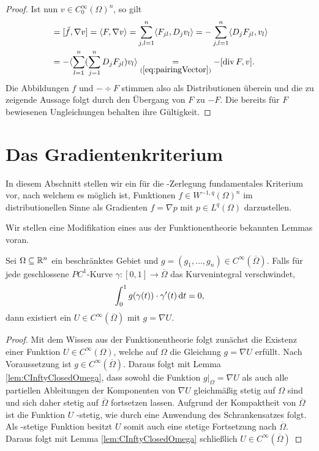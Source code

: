 \begin{proof}
  Ist nun $v \in C_0^\infty(\Omega)^n$, so gilt
  \begin{align*}
    [f,v] &= [\tilde f, \nabla v] = \langle F, \nabla v\rangle = \sum_{j,l=1}^n \langle F_{jl}, D_j v_l \rangle = -\sum_{j,l=1}^n \langle D_j F_{jl}, v_l \rangle \\
    &= - \langle \sum_{l = 1}^n ( \sum_{j = 1}^n D_j F_{jl} ) v_l \rangle \underset{(\ref{eq:pairingVector})}{=} -[\div F, v]. \\
  \end{align*}
  Die Abbildungen $f$ und $-\div F$ stimmen also als Distributionen überein und die zu zeigende Aussage folgt durch den Übergang von $F$ zu $-F$.
  Die bereits für $F$ bewiesenen Ungleichungen behalten ihre Gültigkeit.
\end{proof}

\section{Das Gradientenkriterium}

In diesem Abschnitt stellen wir ein für die \helmholtz\hyp{}Zerlegung fundamentales Kriterium vor, nach welchem es möglich ist, Funktionen $f \in W^{-1,q}(\Omega)^n$ im distributionellen Sinne als Gradienten $f = \nabla p$ mit $p \in L^q(\Omega)$ darzustellen.

Wir stellen eine Modifikation eines aus der Funktionentheorie bekannten Lemmas voran.

\begin{lem}
  \label{lem:existencePotential}
  Sei $\Omega \subseteq \mathbb{R}^n$ ein beschränktes Gebiet und $g = (g_1, \dots, g_n) \in C^\infty(\overline\Omega)$.
  Falls für jede geschlossene $PC^1$-Kurve $\gamma \colon [0,1] \to \overline\Omega$ das Kurvenintegral verschwindet,
$$
  \int_0^1 g(\gamma(t)) \cdot \gamma'(t) \, {\operatorname{d}\!{t}} = 0,  
$$
  dann existiert ein $U\in C^\infty(\overline\Omega)$ mit $g = \nabla U$.
\end{lem}

\begin{proof}
  Mit dem Wissen aus der Funktionentheorie folgt zunächst die Existenz einer Funktion $U \in C^\infty(\Omega)$, welche auf $\Omega$ die Gleichung $g = \nabla U$ erfüllt.
  Nach Voraussetzung ist $g \in C^\infty(\overline\Omega)$.
  Daraus folgt mit Lemma \ref{lem:CInftyClosedOmega}, dass sowohl die Funktion $g|_\Omega = \nabla U$ als auch alle partiellen Ableitungen der Komponenten von $\nabla U$ gleichmäßig stetig auf $\Omega$ sind und sich daher stetig auf $\overline\Omega$ fortsetzen lassen.
  Aufgrund der Kompaktheit von $\overline\Omega$ ist die Funktion $U$ \lipschitz\hyp{}stetig, wie durch eine Anwendung des Schrankensatzes folgt.
  Als \lipschitz\hyp{}stetige Funktion besitzt $U$ somit auch eine stetige Fortsetzung nach $\overline\Omega$.
  Daraus folgt mit Lemma \ref{lem:CInftyClosedOmega} schließlich $U \in C^\infty(\overline\Omega)$ 
\end{proof}

